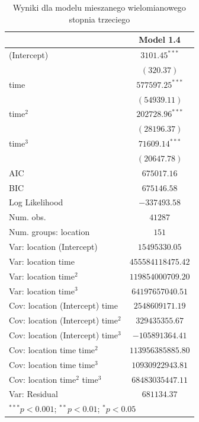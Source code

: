 \documentclass[12pt]{mwbk}
\theoremstyle{plain}
\theoremstyle{definition}
\theoremstyle{definition}
\begin{document}
\begin{table}[htbp]
	\begin{center}
		\begin{tabular}{l c}
			\hline
			& Model 1.4 \\
			\hline
			(Intercept)                                 & $3101.45^{***}$   \\
			& $(320.37)$        \\
			time                              & $577597.25^{***}$ \\
			& $(54939.11)$      \\
			time$^2$                              & $202728.96^{***}$ \\
			& $(28196.37)$      \\
			time$^3$                              & $71609.14^{***}$  \\
			& $(20647.78)$      \\
			\hline
			AIC                                         & $675017.16$       \\
			BIC                                         & $675146.58$       \\
			Log Likelihood                              & $-337493.58$      \\
			Num. obs.                                   & $41287$           \\
			Num. groups: location                       & $151$             \\
			Var: location (Intercept)                   & $15495330.05$     \\
			Var: location time                & $455584118475.42$ \\
			Var: location time$^2$                & $119854000709.20$ \\
			Var: location time$^3$                & $64197657040.51$  \\
			Cov: location (Intercept) time    & $2548609171.19$   \\
			Cov: location (Intercept) time$^2$    & $329435355.67$    \\
			Cov: location (Intercept) time$^3$    & $-105891364.41$   \\
			Cov: location time time$^2$ & $113956385885.80$ \\
			Cov: location time time$^3$ & $10930922943.81$  \\
			Cov: location time$^2$ time$^3$ & $68483035447.11$  \\
			Var: Residual                               & $681134.37$       \\
			\hline
			\multicolumn{2}{l}{\scriptsize{$^{***}p<0.001$; $^{**}p<0.01$; $^{*}p<0.05$}}
		\end{tabular}
		\caption{Wyniki dla modelu mieszanego wielomianowego stopnia trzeciego}
		\label{table:mod1-poly}
	\end{center}
\end{table}
\end{document}
